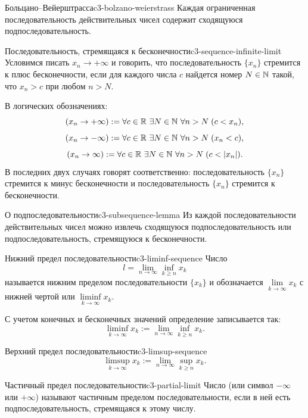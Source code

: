 \begin{lemma}{Больцано--Вейерштрасса}{c3-bolzano-weierstrass}
  Каждая ограниченная последовательность действительных чисел содержит
  сходящуюся подпоследовательность.
\end{lemma}

\begin{definition}{Последовательность, стремящаяся к бесконечности}{c3-sequence-infinite-limit}
  Условимся писать $x_n\to+\infty$ и говорить, что последовательность
  $\{x_n\}$ стремится к плюс бесконечности, если для каждого числа $c$
  найдется номер $N\in\mathbb{N}$ такой, что $x_n>c$ при любом $n>N$.

  В логических обозначениях:
  \[
    (x_n\to+\infty):=\forall c\in\R\ \exists N\in\N\ \forall n>N\;(c<x_n),
  \]
  \[
    (x_n\to-\infty):=\forall c\in\R\ \exists N\in\N\ \forall n>N\;(x_n<c),
  \]
  \[
    (x_n\to\infty):=\forall c\in\R\ \exists N\in\N\ \forall n>N\;(c<|x_n|).
  \]
  В последних двух случаях говорят соответственно: последовательность
  $\{x_n\}$ стремится к минус бесконечности и последовательность $\{x_n\}$
  стремится к бесконечности.
\end{definition}

\begin{lemma}{О подпоследовательности}{c3-subsequence-lemma}
  Из каждой последовательности действительных чисел можно извлечь
  сходящуюся подпоследовательность или подпоследовательность, стремящуюся
  к бесконечности.
\end{lemma}

\begin{definition}{Нижний предел последовательности}{c3-liminf-sequence}
  Число
  \[
    l=\lim_{n\to\infty}\inf_{k\ge n}x_k
  \]
  называется нижним пределом последовательности $\{x_k\}$ и обозначается
  $\lim\limits_{k\to\infty}x_k$ с нижней чертой или
  $\liminf\limits_{k\to\infty}x_k$.

  С учетом конечных и бесконечных значений определение записывается так:
  \[
    \liminf_{k\to\infty}x_k:=
    \lim_{n\to\infty}\inf_{k\ge n}x_k.
  \]
\end{definition}

\begin{definition}{Верхний предел последовательности}{c3-limsup-sequence}
  \[
    \limsup_{k\to\infty}x_k:=
    \lim_{n\to\infty}\sup_{k\ge n}x_k.
  \]
\end{definition}

\begin{definition}{Частичный предел последовательности}{c3-partial-limit}
  Число (или символ $-\infty$ или $+\infty$) называют частичным пределом
  последовательности, если в ней есть подпоследовательность, стремящаяся к
  этому числу.
\end{definition}

